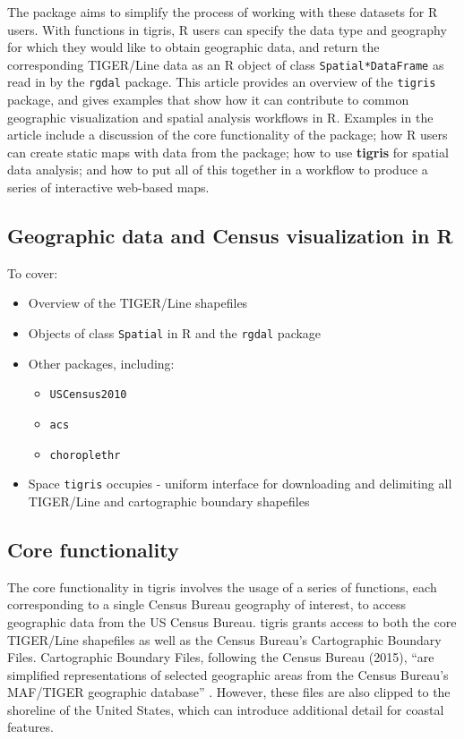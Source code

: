 The  package aims to simplify the process of working
with these datasets for R users. With functions in tigris, R users can
specify the data type and geography for which they would like to obtain
geographic data, and return the corresponding TIGER/Line data as an R
object of class \texttt{Spatial*DataFrame} as read in by the
\texttt{rgdal} package. This article provides an overview of the
\texttt{tigris} package, and gives examples that show how it can
contribute to common geographic visualization and spatial analysis
workflows in R. Examples in the article include a discussion of the core
functionality of the package; how R users can create static maps with
data from the package; how to use \textbf{tigris} for spatial data
analysis; and how to put all of this together in a workflow to produce a
series of interactive web-based maps.

\subsection{Geographic data and Census visualization in
R}\label{geographic-data-and-census-visualization-in-r}

To cover:

\begin{itemize}
\tightlist
\item
  Overview of the TIGER/Line shapefiles
\item
  Objects of class \texttt{Spatial} in R and the \texttt{rgdal} package
\item
  Other packages, including:

  \begin{itemize}
  \tightlist
  \item
    \texttt{USCensus2010}
  \item
    \texttt{acs}
  \item
    \texttt{choroplethr}
  \end{itemize}
\item
  Space \texttt{tigris} occupies - uniform interface for downloading and
  delimiting all TIGER/Line and cartographic boundary shapefiles
\end{itemize}

\subsection{Core functionality}\label{core-functionality}

The core functionality in tigris involves the usage of a series of
functions, each corresponding to a single Census Bureau geography of
interest, to access geographic data from the US Census Bureau. tigris
grants access to both the core TIGER/Line shapefiles as well as the
Census Bureau's Cartographic Boundary Files. Cartographic Boundary
Files, following the Census Bureau (2015), ``are simplified
representations of selected geographic areas from the Census Bureau's
MAF/TIGER geographic database'' \citep{Census2015}. However, these files
are also clipped to the shoreline of the United States, which can
introduce additional detail for coastal features.

